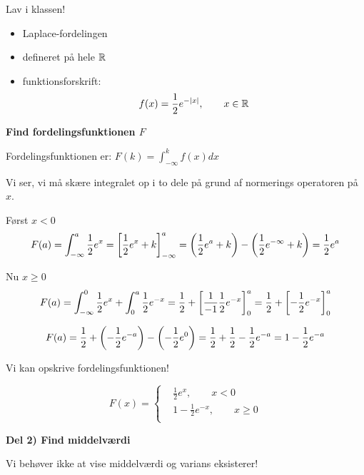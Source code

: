 Lav i klassen!

\begin{itemize}
    \item Laplace-fordelingen
    \item defineret på hele $\mathbb{R}$
    \item funktionsforskrift:
    \begin{equation}
        f(x) = \frac{1}{2}e^{-\lvert x \rvert}, \qquad x \in \mathbb{R}
    \end{equation}
\end{itemize}

\textbf{Find fordelingsfunktionen $F$}

Fordelingsfunktionen er: $F(k) = \int_{-\infty}^{k} f(x) dx $

Vi ser, vi må skære integralet op i to dele på grund af normerings operatoren på $x$.

Først $x < 0$
\begin{equation}
    F(a) = \int_{-\infty}^a \frac{1}{2}e^ {x} = \left[ \frac{1}{2} e^{x} + k \right]_{-\infty}^{a} = \left( \frac{1}{2} e^{a} + k \right) - \left( \frac{1}{2} e^{-\infty} + k\right) = \frac{1}{2} e^{a}
\end{equation}

Nu $x\geq 0$
\begin{equation}
    F(a) = \int_{-\infty}^0 \frac{1}{2}e^ {x} +  \int_{0}^a \frac{1}{2} e^{-x} = \frac{1}{2} + \left[ \frac{1}{-1} \frac{1}{2} e^{- x}  \right]_{0}^{a}  = \frac{1}{2} + \left[ -\frac{1}{2} e^{- x}  \right]_{0}^{a} 
\end{equation}

\begin{equation}
    F(a) = \frac{1}{2} +  \left( - \frac{1}{2} e^{-a} \right) - \left( - \frac{1}{2} e^{0} \right) = \frac{1}{2} + \frac{1}{2} - \frac{1}{2} e^{-a} = 1 - \frac{1}{2} e^{-a} 
\end{equation}

Vi kan opskrive fordelingsfunktionen!

\begin{equation}
    F(x) =
    \begin{cases}
    &\frac{1}{2} e^{x}, \qquad x<0 \\
   &1 - \frac{1}{2} e^{-x}, \qquad  x\geq 0 \\
    \end{cases}
\end{equation}

\textbf{Del 2) Find middelværdi}

Vi behøver ikke at vise middelværdi og varians eksisterer!

